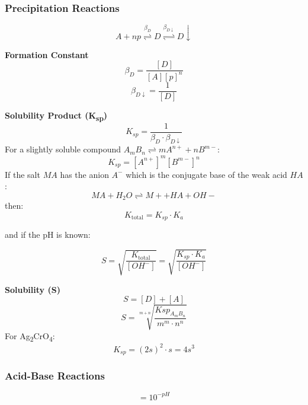 \subsubsection*{Precipitation Reactions} 

\begin{equation}
A + n p \stackrel{\beta_D}{\rightleftharpoons} D \stackrel{\beta_{D\downarrow}}{\rightleftharpoons} D\downarrow
\end{equation}

\textbf{Formation Constant}
\begin{equation}
\beta_D = \frac{[D]}{[A][p]^n}
\end{equation}
\begin{equation}
\beta_{D\downarrow} = \frac{1}{[D]}
\end{equation}

\textbf{Solubility Product (K\textsubscript{sp})}
\begin{equation}
K_{sp} = \frac{1}{\beta_D \cdot \beta_{D\downarrow}}
\end{equation}
For a slightly soluble compound \( A_mB_n \rightleftharpoons mA^{n+} + nB^{m-} \):
\begin{equation}
K_{sp} = [A^{n+}]^m[B^{m-}]^n
\end{equation}
If the salt $MA$ has the anion $A^-$ which is the conjugate base of the weak acid $HA$:
$${MA + H_2O \rightleftharpoons M+ + HA + OH-} $$
then:
$$ K_{\text{total}} = K_{sp} \cdot K_a $$

and if the pH is known:

$$ S = \sqrt{\frac{K_{\text{total}}}{[OH^-]}} = \sqrt{\frac{K_{sp} \cdot K_a}{[OH^-]}} $$

\textbf{Solubility (S)}
\begin{equation}
S = [D] + [A]
\end{equation}
\begin{equation}
S = \sqrt[m+n]{\frac{Ksp_{A_mB_n}}{m^m \cdot n^n}}
\end{equation}
For Ag\textsubscript{2}CrO\textsubscript{4}:
\begin{equation}
K_{sp} = (2s)^2 \cdot s = 4s^3
\end{equation}

\subsubsection*{Acid-Base Reactions}
\begin{equation}
    [H^+] = 10^{-pH}
\end{equation}

